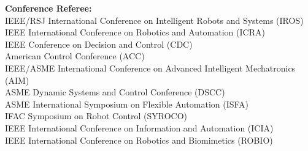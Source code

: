 \documentclass[UTF8,fontset=none]{res}
\begin{document}
\begin{resume}
    \textbf{Conference Referee:}\\
    IEEE/RSJ International Conference on Intelligent Robots and Systems (IROS)\\
    IEEE International Conference on Robotics and Automation (ICRA)\\
    IEEE Conference on Decision and Control (CDC)\\
    American Control Conference (ACC)\\
    IEEE/ASME International Conference on Advanced Intelligent Mechatronics (AIM)\\
    ASME Dynamic Systems and Control Conference (DSCC)\\
    ASME International Symposium on Flexible Automation (ISFA)\\
    IFAC Symposium on Robot Control (SYROCO)\\
    IEEE International Conference on Information and Automation (ICIA)\\
    IEEE International Conference on Robotics and Biomimetics (ROBIO)




\end{resume}
\end{document}
